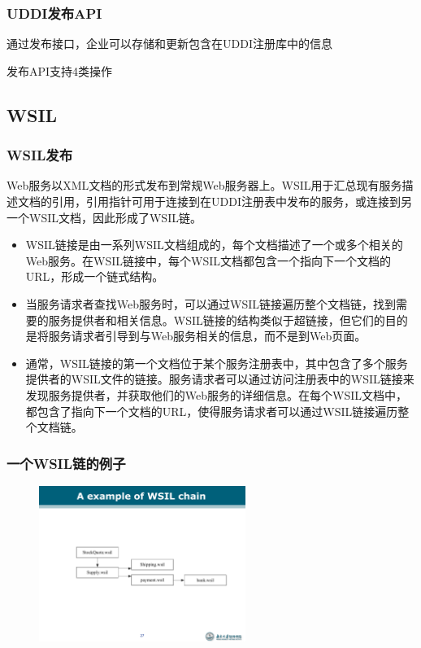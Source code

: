 \subsubsection{UDDI发布API}
通过发布接口，企业可以存储和更新包含在UDDI注册库中的信息

发布API支持4类操作
\vspace{-0.5em}
\begin{spacing}{1.2}
    
\end{spacing}
\vspace{-1.2em}

\subsection{WSIL}

\subsubsection{WSIL发布}
Web服务以XML文档的形式发布到常规Web服务器上。WSIL用于汇总现有服务描述文档的引用，引用指针可用于连接到在UDDI注册表中发布的服务，或连接到另一个WSIL文档，因此形成了WSIL链。
\begin{itemize}
    \item WSIL链接是由一系列WSIL文档组成的，每个文档描述了一个或多个相关的Web服务。在WSIL链接中，每个WSIL文档都包含一个指向下一个文档的URL，形成一个链式结构。
    \item 当服务请求者查找Web服务时，可以通过WSIL链接遍历整个文档链，找到需要的服务提供者和相关信息。WSIL链接的结构类似于超链接，但它们的目的是将服务请求者引导到与Web服务相关的信息，而不是到Web页面。  
    \item 通常，WSIL链接的第一个文档位于某个服务注册表中，其中包含了多个服务提供者的WSIL文件的链接。服务请求者可以通过访问注册表中的WSIL链接来发现服务提供者，并获取他们的Web服务的详细信息。在每个WSIL文档中，都包含了指向下一个文档的URL，使得服务请求者可以通过WSIL链接遍历整个文档链。
\end{itemize}

\subsubsection{一个WSIL链的例子}
\begin{figure}[H]
    \vspace{-0.5em}
	\centering
	\includegraphics[width=0.6\textwidth]{images/A example of WSIL chain.pdf}
    \vspace{-1em}
\end{figure}

